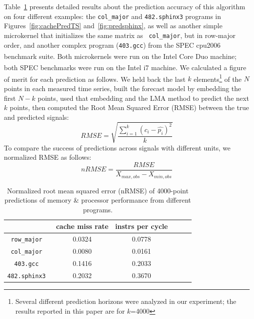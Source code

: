 \documentclass{article}
\begin{document}
Table~\ref{tab:PredError} presents detailed results about the
prediction accuracy of this algorithm on four different examples: the
{\tt col\_major} and {\tt 482.sphinx3} programs in
Figures~\ref{fig:cachePredTS} and~\ref{fig:predsphinx}, as well as
another simple microkernel that initializes the same matrix as {\tt
  col\_major}, but in row-major order, and another complex program
({\tt 403.gcc}) from the SPEC cpu2006 benchmark suite.  Both
microkernels were run on the Intel Core
Duo\textsuperscript{\textregistered} machine; both SPEC benchmarks
were run on the Intel i7\textsuperscript{\textregistered} machine.  We
calculated a figure of merit for each prediction as follows.  We held
back the last $k$ elements\footnote{Several different prediction
  horizons were analyzed in our experiment; the results reported in
  this paper are for $k$=4000} of the $N$ points in each measured time
series, built the forecast model by embedding the first $N-k$ points,
used that embedding and the LMA method to predict the next $k$ points,
then computed the Root Mean Squared Error (RMSE) between the true and
predicted signals:
$$RMSE = \sqrt{\frac{\sum_{i=1}^k(c_i-\hat{p_i})^2}{k}}$$
%
To compare the success of predictions across signals with different
units, we normalized RMSE as follows:
$$nRMSE = \frac{RMSE}{X_{max,obs}-X_{min,obs}}$$
%

  \begin{table}[htbp]
   \renewcommand{\arraystretch}{1.3}
   \caption{Normalized root mean squared error (nRMSE) of 4000-point
     predictions of memory \& processor performance from different
     programs.}
   \label{tab:PredError}
   \centering
   \begin{tabular}{|c|c|c|c|c|c|}
     \hline
      & cache miss rate & instrs per cycle \\
     \hline
     \tt{row\_major}  & 0.0324  & 0.0778 \\
          \hline
     \tt{col\_major}  &0.0080& 0.0161 \\
     \hline
     \tt{403.gcc}  & 0.1416& 0.2033 \\
          \hline
     \tt{482.sphinx3} & 0.2032& 0.3670 \\
      \hline
   \end{tabular}
 \end{table}
\end{document}
